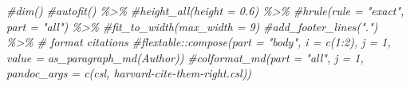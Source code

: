 \documentclass[
]{article}
\newenvironment{Shaded}{\begin{snugshade}}{\end{snugshade}}
\newcommand{\CommentTok}[1]{\textcolor[rgb]{0.56,0.35,0.01}{\textit{#1}}}
\begin{document}
\begin{landscape}
\begin{Shaded}
\begin{Highlighting}[]
  \CommentTok{\#dim()}
  \CommentTok{\#autofit() \%\textgreater{}\% }
  \CommentTok{\#height\_all(height = 0.6) \%\textgreater{}\% }
  \CommentTok{\#hrule(rule = "exact", part = "all") \%\textgreater{}\% }
  \CommentTok{\#fit\_to\_width(max\_width = 9)}
  \CommentTok{\#add\_footer\_lines(".") \%\textgreater{}\%}
  \CommentTok{\# format citations}
  \CommentTok{\#flextable::compose(part = "body", i = c(1:2), j = 1, value = as\_paragraph\_md(Author))}
  \CommentTok{\#colformat\_md(part = "all", j = 1, pandoc\_args = c(\textquotesingle{}{-}{-}csl\textquotesingle{}, \textquotesingle{}harvard{-}cite{-}them{-}right.csl\textquotesingle{}))}
\end{Highlighting}
\end{Shaded}

\end{landscape}
\end{document}
